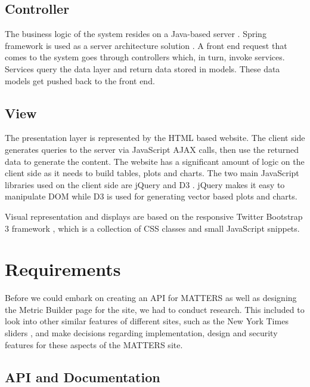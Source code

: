 		\subsection{Controller}
		
			The business logic of the system resides on a Java-based server \cite{java}. 
			Spring framework is used as a server architecture solution \cite{spring}. A front 
			end request that comes to the system goes through controllers which, 
			in turn, invoke services. Services query the data layer and return 
			data stored	in models. These data models get pushed back to the 
			front end.
			
		\subsection{View}
			
			The presentation layer is represented by the HTML based website. The
			client side generates queries to the server via JavaScript AJAX 
			calls, then use the returned data to generate the content. The 
			website has a significant amount of logic on the client side as it 
			needs to build tables, plots and charts. The two main JavaScript 
			libraries used on the client side are jQuery \cite{jquery} and D3 \cite{d3}. jQuery makes it 
			easy to manipulate DOM while D3 is used for generating vector based 
			plots and charts.
			
			Visual representation and displays are based on the responsive 
			Twitter Bootstrap 3 framework \cite{bootstrap}, which is a collection of CSS classes 
			and small JavaScript snippets. 

	\section{Requirements}

		Before we could embark on creating an API for MATTERS as well as 
		designing the Metric Builder page for the site, we had to conduct 
		research. This included to look into other similar features of different 
		sites, such as the New York Times sliders \cite{slider}, and make decisions regarding implementation, design and security 
		features for these aspects of the MATTERS site.

	\subsection{API and Documentation}


